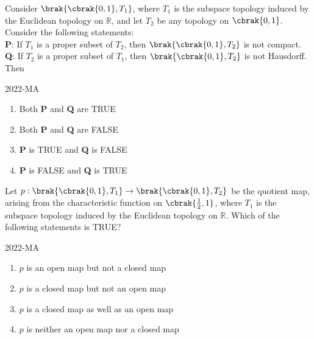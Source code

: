 \item Consider $\brak{\cbrak{0,1}, T_1}$, where $T_1$ is the subspace topology induced by the Euclidean topology on $\mathbb{R}$, and let $T_2$ be any topology on $\cbrak{0,1}$. Consider the following statements: \\
	\textbf{P}: If $T_1$ is a proper subset of $T_2$, then $\brak{\cbrak{0,1}, T_2}$ is not compact. \\
	\textbf{Q}: If $T_2$ is a proper subset of $T_1$, then $\brak{\cbrak{0,1}, T_2}$ is not Hausdorff. \\
	Then
	
	\hfill{2022-MA}

	\begin{enumerate}
		\item Both \textbf{P} and \textbf{Q} are TRUE
		\item Both \textbf{P} and \textbf{Q} are FALSE
		\item \textbf{P} is TRUE and \textbf{Q} is FALSE
		\item \textbf{P} is FALSE and \textbf{Q} is TRUE
	\end{enumerate}

\item Let $p:\brak{\cbrak{0,1}, T_1} \to \brak{\cbrak{0,1}, T_2}$ be the quotient map, arising from the characteristic function on $\cbrak{ \frac{1}{2}, 1}$, where $T_1$ is the subspace topology induced by the Euclidean topology on $\mathbb{R}$. Which of the following statements is TRUE?
	
	\hfill{2022-MA}

	\begin{enumerate}
		\item $p$ is an open map but not a closed map
		\item $p$ is a closed map but not an open map
		\item $p$ is a closed map as well as an open map
		\item $p$ is neither an open map nor a closed map
	\end{enumerate}



%
